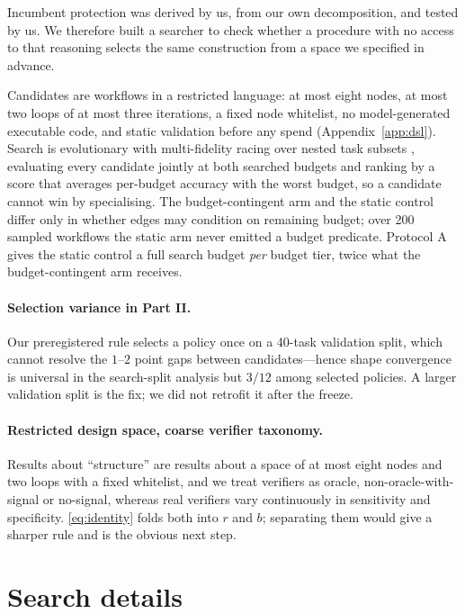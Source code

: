 \documentclass{article}
\newcommand{\rrate}{r}
\newcommand{\brate}{b}
\begin{document}
Incumbent protection was derived by us, from our own decomposition, and tested
by us. We therefore built a searcher to check whether a procedure with no access to
that reasoning selects the same construction from a space we specified in
advance.

Candidates are workflows in a restricted language: at most eight nodes, at most
two loops of at most three iterations, a fixed node whitelist, no
model-generated executable code, and static validation before any spend
(Appendix~\ref{app:dsl}). Search is evolutionary with multi-fidelity racing over
nested task subsets \citep{jamieson2016successive}, evaluating every candidate
jointly at both searched budgets and ranking by a score that averages per-budget
accuracy with the worst budget, so a candidate cannot win by specialising. The
budget-contingent arm and the static control differ only in whether edges may
condition on remaining budget; over 200 sampled workflows the static arm never
emitted a budget predicate. Protocol A gives the static control a full search
budget \emph{per} budget tier, twice what the budget-contingent arm receives.

\paragraph{Selection variance in Part II.} Our preregistered rule selects a
policy once on a 40-task validation split, which cannot resolve the $1$--$2$
point gaps between candidates---hence shape convergence is universal in the
search-split analysis but $3/12$ among selected policies. A larger validation
split is the fix; we did not retrofit it after the freeze.

\paragraph{Restricted design space, coarse verifier taxonomy.} Results about
``structure'' are results about a space of at most eight nodes and two loops with
a fixed whitelist, and we treat verifiers as oracle, non-oracle-with-signal or
no-signal, whereas real verifiers vary continuously in sensitivity and
specificity. \eqref{eq:identity} folds both into $\rrate$ and $\brate$;
separating them would give a sharper rule and is the obvious next step.

\section{Search details}
\label{app:search}
\end{document}
